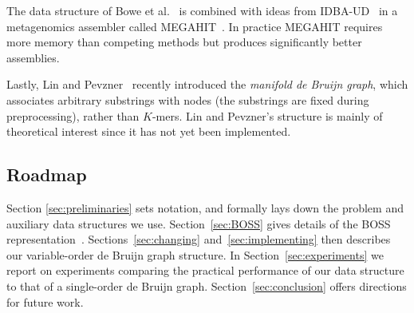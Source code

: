 The data structure of Bowe et al.~\cite{BOSS12}
is combined with ideas from IDBA-UD~\cite{idbaud} in a metagenomics assembler
called MEGAHIT~\cite{megahit}.  In practice MEGAHIT requires more memory than
competing methods 
but produces significantly better assemblies.

Lastly, Lin and Pevzner~\cite{mdbg} recently introduced the {\em manifold de
Bruijn graph}, which 
associates arbitrary substrings with nodes (the substrings are fixed during
preprocessing), rather than $K$-mers. Lin and Pevzner's structure is mainly of
theoretical interest since it has not yet been implemented.

\subsection{Roadmap} Section \ref{sec:preliminaries} sets notation, and formally
lays down the problem and auxiliary data structures we use.
Section~\ref{sec:BOSS} gives details of the BOSS representation~\cite{BOSS12}.
Sections~\ref{sec:changing} and~\ref{sec:implementing} then describes our
variable-order de Bruijn graph structure. In Section~\ref{sec:experiments} we
report on experiments comparing the practical performance of our data structure
to that of a single-order de Bruijn graph. Section~\ref{sec:conclusion} offers
directions for future work.

